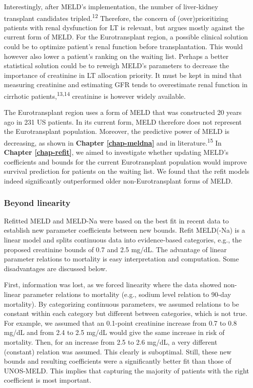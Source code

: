 \documentclass[11pt,english,]{book} %
\begin{document}
Interestingly, after MELD's implementation, the number of liver-kidney transplant candidates tripled.\textsuperscript{12} Therefore, the concern of (over)prioritizing patients with renal dysfunction for LT is relevant, but argues mostly against the current form of MELD. For the Eurotransplant region, a possible clinical solution could be to optimize patient's renal function before transplantation. This would however also lower a patient's ranking on the waiting list. Perhaps a better statistical solution could be to reweigh MELD's parameters to decrease the importance of creatinine in LT allocation priority. It must be kept in mind that measuring creatinine and estimating GFR tends to overestimate renal function in cirrhotic patients,\textsuperscript{13,14} creatinine is however widely available.

The Eurotransplant region uses a form of MELD that was constructed 20 years ago in 231 US patients. In its current form, MELD therefore does not represent the Eurotransplant population. Moreover, the predictive power of MELD is decreasing, as shown in \textbf{Chapter \ref{chap-meldna}} and in literature.\textsuperscript{15} In \textbf{Chapter \ref{chap-refit}}, we aimed to investigate whether updating MELD's coefficients and bounds for the current Eurotransplant population would improve survival prediction for patients on the waiting list. We found that the refit models indeed significantly outperformed older non-Eurotransplant forms of MELD.

\hypertarget{beyond-linearity}{%
\subsubsection*{Beyond linearity}\label{beyond-linearity}}

Refitted MELD and MELD-Na were based on the best fit in recent data to establish new parameter coefficients between new bounds. Refit MELD(-Na) is a linear model and splits continuous data into evidence-based categories, e.g., the proposed creatinine bounds of 0.7 and 2.5 mg/dL. The advantage of linear parameter relations to mortality is easy interpretation and computation. Some disadvantages are discussed below.

First, information was lost, as we forced linearity where the data showed non-linear parameter relations to mortality (e.g., sodium level relation to 90-day mortality). By categorizing continuous parameters, we assumed relations to be constant within each category but different between categories, which is not true. For example, we assumed that an 0.1-point creatinine increase from 0.7 to 0.8 mg/dL and from 2.4 to 2.5 mg/dL would give the same increase in risk of mortality. Then, for an increase from 2.5 to 2.6 mg/dL, a very different (constant) relation was assumed. This clearly is suboptimal. Still, these new bounds and resulting coefficients were a significantly better fit than those of UNOS-MELD. This implies that capturing the majority of patients with the right coefficient is most important.
\end{document}
